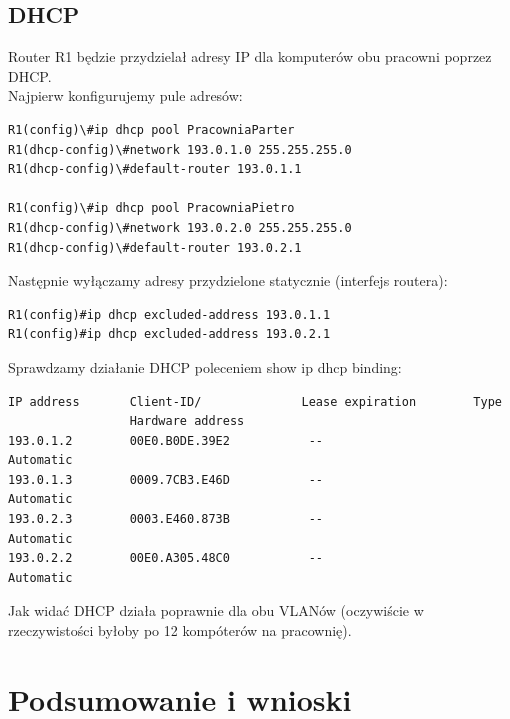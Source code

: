 \documentclass[11pt,a4paper]{article}
\begin{document}
\subsection{DHCP}
Router R1 będzie przydzielał adresy IP dla komputerów obu pracowni poprzez DHCP.\\
Najpierw konfigurujemy pule adresów:
\begin{lstlisting}
R1(config)\#ip dhcp pool PracowniaParter
R1(dhcp-config)\#network 193.0.1.0 255.255.255.0
R1(dhcp-config)\#default-router 193.0.1.1

R1(config)\#ip dhcp pool PracowniaPietro
R1(dhcp-config)\#network 193.0.2.0 255.255.255.0
R1(dhcp-config)\#default-router 193.0.2.1
\end{lstlisting}
Następnie wyłączamy adresy przydzielone statycznie (interfejs routera):
\begin{lstlisting}
R1(config)#ip dhcp excluded-address 193.0.1.1
R1(config)#ip dhcp excluded-address 193.0.2.1
\end{lstlisting}
Sprawdzamy działanie DHCP poleceniem show ip dhcp binding:
\begin{lstlisting}
IP address       Client-ID/              Lease expiration        Type
                 Hardware address
193.0.1.2        00E0.B0DE.39E2           --                     Automatic
193.0.1.3        0009.7CB3.E46D           --                     Automatic
193.0.2.3        0003.E460.873B           --                     Automatic
193.0.2.2        00E0.A305.48C0           --                     Automatic
\end{lstlisting}
Jak widać DHCP działa poprawnie dla obu VLANów (oczywiście w rzeczywistości byłoby po 12 kompóterów na pracownię).
\section{Podsumowanie i wnioski}
\end{document}
